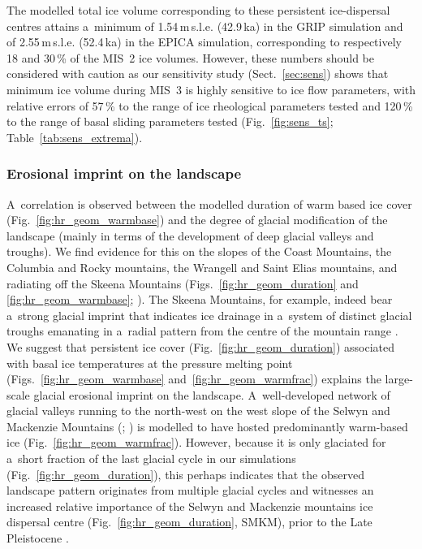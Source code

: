 \documentclass[tc, manuscript]{copernicus}
\begin{document}
      The modelled total ice volume corresponding to these persistent
      ice-dispersal centres attains a~minimum of 1.54\,\unit{m}\,s.l.e.
      (42.9\,\unit{ka}) in the GRIP simulation and of 2.55\,\unit{m}\,s.l.e.
      (52.4\,\unit{ka}) in the EPICA simulation, corresponding to
      respectively 18 and 30\,\unit{\%} of the MIS~2 ice volumes.
      However, these numbers should be considered with caution as our
      sensitivity study (Sect.~\ref{sec:sens}) shows that minimum ice volume
      during MIS~3 is highly sensitive to ice flow parameters, with relative
      errors of 57\,\unit{\%} to the range of ice rheological parameters
      tested and 120\,\unit{\%} to the range of basal sliding parameters
      tested (Fig.~\ref{fig:sens_ts}; Table~\ref{tab:sens_extrema}).

\subsubsection{Erosional imprint on the landscape}

      A~correlation is observed between the modelled duration of warm based
      ice cover (Fig.~\ref{fig:hr_geom_warmbase}) and the degree of glacial
      modification of the landscape (mainly in terms of the development of
      deep glacial valleys and troughs). We find evidence for this on the
      slopes of the Coast Mountains, the Columbia and Rocky mountains,
      the Wrangell and Saint Elias mountains, and radiating off the Skeena
      Mountains (Figs.~\ref{fig:hr_geom_duration} and
      \ref{fig:hr_geom_warmbase}; \citealp[Fig.~2]{Kleman.etal.2010}). The
      Skeena Mountains, for example, indeed bear a~strong glacial imprint
      that indicates ice drainage in a~system of distinct glacial troughs
      emanating in a~radial pattern from the centre of the mountain range
      \citep[Fig.~2]{Kleman.etal.2010}. We suggest that persistent ice cover
      (Fig.~\ref{fig:hr_geom_duration}) associated with basal ice
      temperatures at the pressure melting point
      (Figs.~\ref{fig:hr_geom_warmbase} and~\ref{fig:hr_geom_warmfrac})
      explains the large-scale glacial erosional imprint on the landscape.
      A~well-developed network of glacial valleys running to the north-west
      on the west slope of the Selwyn and Mackenzie Mountains
      (\citealp[Fig.~2]{Kleman.etal.2010}; \citealp[Fig.~8]
      {Stroeven.etal.2010}) is modelled to have hosted predominantly
      warm-based ice (Fig.~\ref{fig:hr_geom_warmfrac}). However, because it
      is only glaciated for a~short fraction of the last glacial cycle in
      our simulations (Fig.~\ref{fig:hr_geom_duration}), this perhaps
      indicates that the observed landscape pattern originates from multiple
      glacial cycles and witnesses an increased relative importance of the
      Selwyn and Mackenzie mountains ice dispersal centre
      (Fig.~\ref{fig:hr_geom_duration}, SMKM), prior to the Late Pleistocene
      \citep[cf.][]{Ward.etal.2008, Demuro.etal.2012}.
\end{document}

